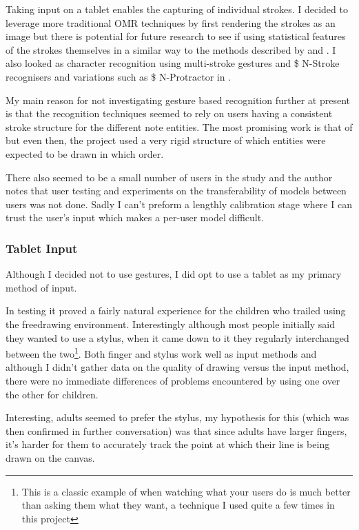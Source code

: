 Taking input on a tablet enables the capturing of individual strokes. I decided to leverage more traditional OMR techniques by first rendering the strokes as an image but there is potential for future research to see if using statistical features of the strokes themselves in a similar way to the methods described by \cite{taubman2005musichand} and \cite{george2003online}. I also looked as character recognition using multi-stroke gestures and \$ N-Stroke recognisers and variations such as \$ N-Protractor in \cite{anthony2012n}.

My main reason for not investigating gesture based recognition further at present is that the recognition techniques seemed to rely on users having a consistent stroke structure for the different note entities. The most promising work is that of \cite{taubman2005musichand} but even then, the project used a very rigid structure of which entities were expected to be drawn in which order.

There also seemed to be a small number of users in the \cite{taubman2005musichand} study and the author notes that user testing and experiments on the transferability of models between users was not done. Sadly I can't preform a lengthly calibration stage where I can trust the user's input which makes a per-user model difficult.

\subsubsection{Tablet Input}

Although I decided not to use gestures, I did opt to use a tablet as my primary method of input.

In testing it proved a fairly natural experience for the children who trailed \noteED using the freedrawing environment. Interestingly although most people initially said they wanted to use a stylus, when it came down to it they regularly interchanged between the two\footnote{This is a classic example of when watching what your users do is much better than asking them what they want, a technique I used quite a few times in this project}. Both finger and stylus work well as input methods and although I didn't gather data on the quality of drawing versus the input method, there were no immediate differences of problems encountered by using one over the other for children.

Interesting, adults seemed to prefer the stylus, my hypothesis for this (which was then confirmed in further conversation) was that since adults have larger fingers, it's harder for them to accurately track the point at which their line is being drawn on the canvas.

